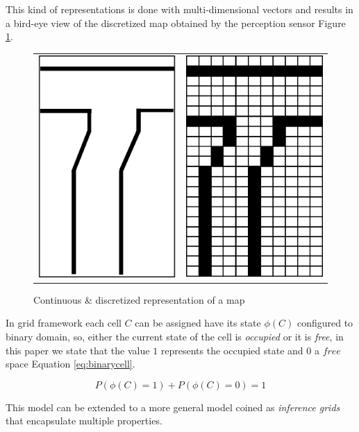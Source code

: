 This kind of representations is done with multi-dimensional vectors and results in a bird-eye view of the discretized map obtained by the perception sensor Figure \ref{fig:grid:continuous:discretized}.

\begin{figure}[h]
\centering
	\begin{tabular}{lr}\\
		\includegraphics[width=0.25\columnwidth]{img/fig:grid:continuous} &
		\includegraphics[width=0.25\columnwidth]{img/fig:grid:discretized}
	\end{tabular}
	\caption{Continuous \& discretized representation of a map}
	\label{fig:grid:continuous:discretized}
\end{figure}

In grid framework each cell $C$ can be assigned have its state $\phi(C)$ configured to binary domain, so, either the current state of the cell is \textit{occupied} or it is \textit{free}, in this paper we state that the value $1$ represents the occupied state and $0$ a $free$ space Equation \ref{eq:binarycell}.

\begin{equation}
P(\phi(C)=1) + P(\phi(C)=0) = 1
\label{eq:binarycell}
\end{equation}

This model can be extended to a more general model coined as \textit{inference grids} that encapsulate multiple properties\cite{Elfes:1989:OGP:916528}.

